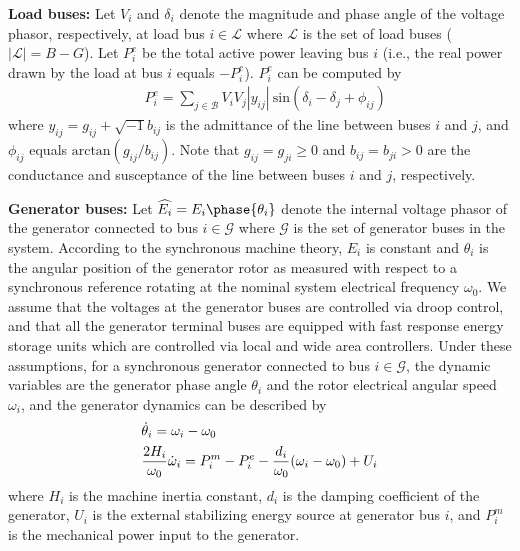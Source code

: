 \textbf{Load buses:} Let $V_i$ and $\delta_i$ denote the magnitude and phase angle of the voltage phasor, respectively, at load bus $i\in\mathcal{L}$ where $\mathcal{L}$ is the set of load buses ($|\mathcal{L}|=B-G$). Let $P_i^e$ be the total active power leaving bus $i$ (i.e., the real power drawn by the load
at bus $i$ equals $-P_i^e$). $P_i^e$ can be computed by
\begin{align}
\label{load_bus}&P_i^e=\sum_{j\in\mathcal{B}}{{V_i V_j |y_{ij}|~\text{sin}(\delta_i-\delta_j+\phi_{ij})}}
\end{align}
where $y_{ij}=g_{ij}+\sqrt{-1} b_{ij}$ is the admittance of the line between buses $i$ and $j$, and $\phi_{ij}$ equals $\text{arctan}(g_{ij}/b_{ij})$. Note that $g_{ij}=g_{ji}\ge0$ and $b_{ij}=b_{ji}>0$ are the conductance and susceptance of the line between buses $i$ and $j$, respectively.




\textbf{Generator buses:} Let $\widehat{E_i}=E_i \phase{\theta_i}$ denote the internal voltage phasor of the generator connected to bus $i\in\mathcal{G}$ where $\mathcal{G}$ is the set of generator buses in the system. According to the synchronous machine theory, $E_i$ is constant and $\theta_i$ is the angular position of the generator rotor as measured with respect to a synchronous reference rotating at the nominal system electrical frequency $\omega_0$. We assume that the voltages at the generator buses are controlled via droop control, and that all the generator terminal buses are equipped with fast response energy storage units which are controlled via local and wide area controllers. Under these assumptions, for a synchronous generator connected to bus $i\in\mathcal{G}$, the dynamic variables are the generator phase angle $\theta_i$ and the rotor electrical angular speed $\omega_i$, and the generator dynamics can be described by \cite{Kundur}
\begin{align}
\label{swing1k}&\dot{\theta}_i=\omega_i-\omega_0\\
\label{swing2k}&\frac{2H_i}{\omega_0} \dot{\omega}_i=P_i^m-P_i^e-\textcolor{black}{\frac{d_i}{\omega_0} (\omega_i-\omega_0)}+ U_i
\end{align}
where $H_i$ is the machine inertia constant, $d_i$ is the damping coefficient of the generator, $U_i$ is the external stabilizing energy source at generator bus $i$, and $P_i^m$ is the mechanical power input to the generator. %


